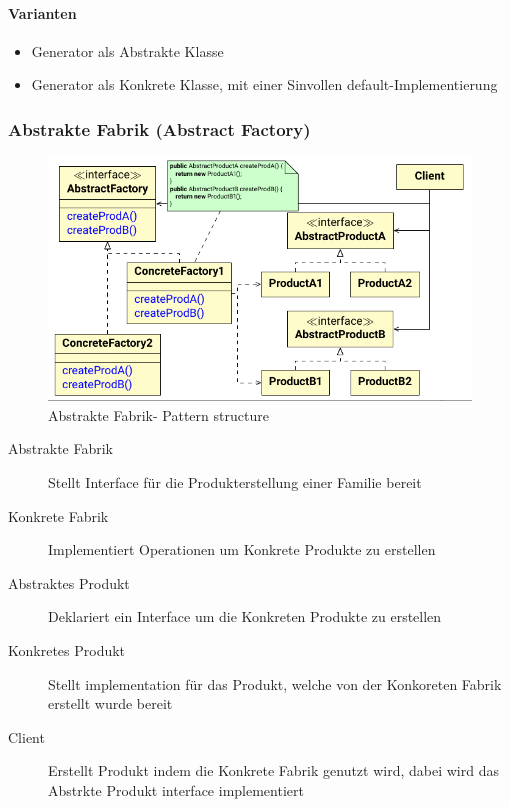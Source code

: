 \documentclass[ngerman,color=3b]{tuda_summary}
\begin{document}
\paragraph{Varianten}
\begin{itemize}
    \item Generator als Abstrakte Klasse
    \item Generator als Konkrete Klasse, mit einer Sinvollen default-Implementierung
\end{itemize}
\clearpage
\subsubsection{Abstrakte Fabrik (Abstract Factory)}
\begin{figure}[ht]
    \centering
    \includegraphics[width=.7\textwidth]{bilder/SE_08_DesignPatterns-seiten-37_cropped.pdf}
    \caption{Abstrakte Fabrik- Pattern structure}
\end{figure}
\FloatBarrier
\begin{description}
    \item[Abstrakte Fabrik] Stellt Interface für die Produkterstellung einer Familie bereit
    \item[Konkrete Fabrik] Implementiert Operationen um Konkrete Produkte zu erstellen
    \item[Abstraktes Produkt] Deklariert ein Interface um die Konkreten Produkte zu erstellen
    \item[Konkretes Produkt] Stellt implementation für das Produkt, welche von der Konkoreten Fabrik erstellt wurde bereit
    \item[Client] Erstellt Produkt indem die Konkrete Fabrik genutzt wird, dabei wird das Abstrkte Produkt interface implementiert
\end{description}
\end{document}
